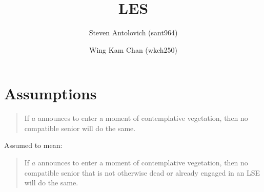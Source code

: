 \documentclass[a4paper]{article}
\title{LES}
\author{Steven Antolovich (sant964) \and Wing Kam Chan (wkch250)}
\begin{document}
\maketitle

\section{Assumptions}
\begin{quote}
If $a$ announces to enter a moment of contemplative vegetation, then no compatible senior will do the same.
\end{quote}
Assumed to mean:
\begin{quote}
If $a$ announces to enter a moment of contemplative vegetation, then no compatible senior that is not otherwise dead or already engaged in an LSE will do the same.
\end{quote}
\end{document}
